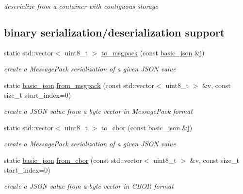 \begin{DoxyCompactItemize}
\begin{DoxyCompactList}\small\item\em deserialize from a container with contiguous storage \end{DoxyCompactList}\end{DoxyCompactItemize}
\subsection*{binary serialization/deserialization support}
\begin{DoxyCompactItemize}
\item 
static std\+::vector$<$ uint8\+\_\+t $>$ \mbox{\hyperlink{classnlohmann_1_1basic__json_a09ca1dc273d226afe0ca83a9d7438d9c}{to\+\_\+msgpack}} (const \mbox{\hyperlink{classnlohmann_1_1basic__json}{basic\+\_\+json}} \&j)
\begin{DoxyCompactList}\small\item\em create a Message\+Pack serialization of a given J\+S\+ON value \end{DoxyCompactList}\item 
static \mbox{\hyperlink{classnlohmann_1_1basic__json}{basic\+\_\+json}} \mbox{\hyperlink{classnlohmann_1_1basic__json_a3eafe0b1fb2f2c443f1b3fea55c8a470}{from\+\_\+msgpack}} (const std\+::vector$<$ uint8\+\_\+t $>$ \&v, const size\+\_\+t start\+\_\+index=0)
\begin{DoxyCompactList}\small\item\em create a J\+S\+ON value from a byte vector in Message\+Pack format \end{DoxyCompactList}\item 
static std\+::vector$<$ uint8\+\_\+t $>$ \mbox{\hyperlink{classnlohmann_1_1basic__json_a2566783e190dec524bf3445b322873b8}{to\+\_\+cbor}} (const \mbox{\hyperlink{classnlohmann_1_1basic__json}{basic\+\_\+json}} \&j)
\begin{DoxyCompactList}\small\item\em create a Message\+Pack serialization of a given J\+S\+ON value \end{DoxyCompactList}\item 
static \mbox{\hyperlink{classnlohmann_1_1basic__json}{basic\+\_\+json}} \mbox{\hyperlink{classnlohmann_1_1basic__json_ab5e3e1758c1a52ffe89b1d379ef7fbe1}{from\+\_\+cbor}} (const std\+::vector$<$ uint8\+\_\+t $>$ \&v, const size\+\_\+t start\+\_\+index=0)
\begin{DoxyCompactList}\small\item\em create a J\+S\+ON value from a byte vector in C\+B\+OR format \end{DoxyCompactList}\end{DoxyCompactItemize}
